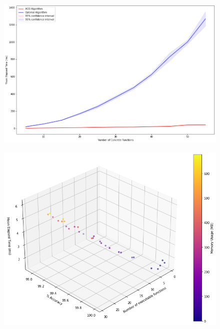 \documentclass[13.5pt]{beamer}
\begin{document}
\begin{frame}
	
	\begin{figure}[h]
		\centering
		\includegraphics[width=\textwidth, height=0.8\textheight]{../Images/ACOvsOptimalIncreasingConcrete.png}
	\end{figure}
	
\end{frame}


\begin{frame}
	
	\begin{figure}[h]
		\centering
		\includegraphics[width=\textwidth, height=0.8\textheight]{../Images/ACO3DIncreasingExecutable.png}
	\end{figure}
	
\end{frame}
\end{document}
